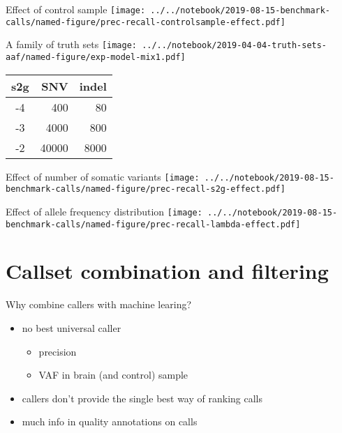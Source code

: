 \documentclass{beamer}
\begin{document}
\begin{frame}{Effect of control sample}
\texttt{[image: ../../notebook/2019-08-15-benchmark-calls/named-figure/prec-recall-controlsample-effect.pdf]}
\end{frame}

\begin{frame}[label=familyoftruthsets]{A family of truth sets}
\texttt{[image: ../../notebook/2019-04-04-truth-sets-aaf/named-figure/exp-model-mix1.pdf]}
{\tiny
\begin{tabular}{c|r|r}
s2g & SNV & indel \\
\hline
-4 & 400 & 80 \\
-3 & 4000 & 800 \\
-2 & 40000 & 8000 \\
\end{tabular}
}
\end{frame}

\begin{frame}{Effect of number of somatic variants}
\texttt{[image: ../../notebook/2019-08-15-benchmark-calls/named-figure/prec-recall-s2g-effect.pdf]}
\end{frame}


\begin{frame}{Effect of allele frequency distribution}
\texttt{[image: ../../notebook/2019-08-15-benchmark-calls/named-figure/prec-recall-lambda-effect.pdf]}
\end{frame}

\section{Callset combination and filtering}

\begin{frame}{Why combine callers with machine learing?}
\begin{itemize}
\item no best universal caller
\begin{itemize}
\item precision
\item VAF in brain (and control) sample
\end{itemize}
\item callers don't provide the single best way of ranking calls
\item much info in quality annotations on calls
\end{itemize}
\end{frame}
\end{document}
